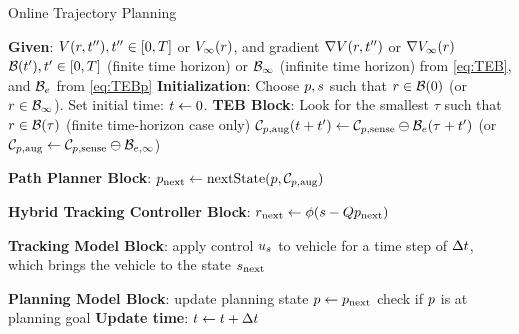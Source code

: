 \begin{algorithm}	
	\caption{Online Trajectory Planning}
	\label{alg:algOnline}
	\begin{algorithmic}[1]
		\STATE \textbf{Given}: \label{ln:gStart}
		\STATE $V(r, t''), t'' \in [0, T]$ or $V_\infty(r)$, and gradient $\nabla V(r, t'')$ or $\nabla V_\infty(r)$
 		\STATE $\mathcal B(t'), t' \in [0,T]$ (finite time horizon) or $\mathcal B_\infty$ (infinite time horizon) from \eqref{eq:TEB}, and $\mathcal B_e$ from \eqref{eq:TEBp} \label{ln:gEnd}
    \STATE \textbf{Initialization}: \label{ln:Istart}
		\STATE Choose $p, s$ such that $r \in \mathcal B(0)$ (or $r\in\mathcal B_\infty$).
    \STATE Set initial time: $t \leftarrow 0$. \label{ln:Iend}
		\STATE \textbf{TEB Block}: \label{ln:obsStart}
    \STATE Look for the smallest $\tau$ such that $r \in \mathcal B(\tau)$ (finite time-horizon case only)
		\STATE $\mathcal C_{p,\text{aug}}(t + t') \leftarrow \mathcal C_{p,\text{sense}} \ominus \mathcal B_e(\tau + t')$ \label{ln:obsEnd}
    \STATE (or $\mathcal C_{p,\text{aug}} \leftarrow \mathcal C_{p,\text{sense}} \ominus \mathcal B_{e, \infty}$) 
		
		\STATE \textbf{Path Planner Block}:\label{ln:plannerStart}
		\STATE $p_\text{next} \leftarrow \text{nextState}(p, \mathcal C_{p,\text{aug}})$\label{ln:plannerEnd}
		
		\STATE \textbf{Hybrid Tracking Controller Block}:\label{ln:controllerStart}
		\STATE $r_\text{next} \leftarrow \phi(s - Qp_\text{next})$
		
		\ELSE {} 
           \ENDIF \label{ln:controllerEnd}
		
		\STATE \textbf{Tracking Model Block}: \label{ln:trackingStart}
		\STATE apply control $u_s$ to vehicle for a time step of $\Delta t$, which brings the vehicle to the state $s_\text{next}$ \label{ln:trackingEnd}
		
		\STATE \textbf{Planning Model Block}:\label{ln:planningStart}
		\STATE update planning state $p \leftarrow p_\text{next}$
		\STATE check if $p$ is at planning goal \label{ln:planningEnd}
    \STATE \textbf{Update time}:
    \STATE $t \leftarrow t + \Delta t$
		\ENDWHILE
	\end{algorithmic}
\end{algorithm}
